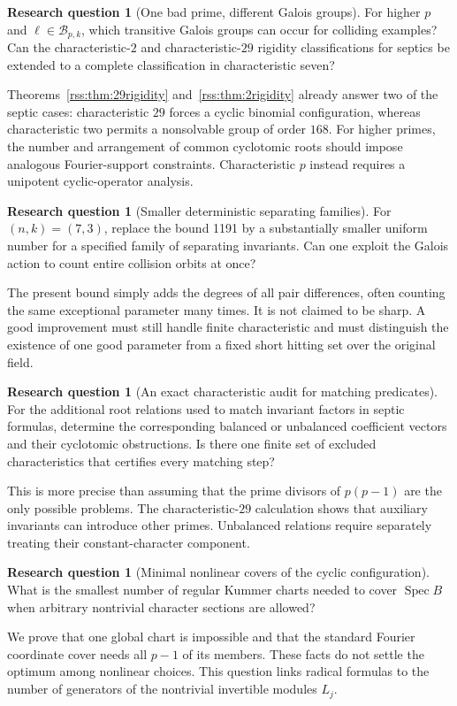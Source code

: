 \documentclass[11pt,a4paper]{article}
\theoremstyle{definition}
\newtheorem{question}[theorem]{Research question}
\theoremstyle{remark}
\newcommand{\Spec}{\operatorname{Spec}}
\begin{document}
\begin{question}[One bad prime, different Galois groups]
For higher $p$ and $\ell\in\mathcal B_{p,k}$, which transitive
Galois groups can occur for colliding examples? Can the characteristic-$2$
and characteristic-$29$ rigidity classifications for septics be extended
to a complete classification in characteristic seven?
\end{question}
Theorems~\ref{rss:thm:29rigidity} and~\ref{rss:thm:2rigidity} already answer two
of the septic cases: characteristic $29$ forces a cyclic binomial
configuration, whereas characteristic two permits a nonsolvable group of
order $168$. For higher primes, the number and arrangement of common
cyclotomic roots should impose analogous Fourier-support constraints.
Characteristic $p$ instead requires a unipotent cyclic-operator analysis.

\begin{question}[Smaller deterministic separating families]
For $(n,k)=(7,3)$, replace the bound 1191 by a substantially smaller uniform
number for a specified family of separating invariants. Can one exploit
the Galois action to count entire collision orbits at once?
\end{question}
The present bound simply adds the degrees of all pair differences, often
counting the same exceptional parameter many times. It is not claimed to
be sharp. A good improvement must still handle finite characteristic and
must distinguish the existence of one good parameter from a fixed short
hitting set over the original field.

\begin{question}[An exact characteristic audit for matching predicates]
For the additional root relations used to match invariant factors in
septic formulas, determine the corresponding balanced or unbalanced
coefficient vectors and their cyclotomic obstructions. Is there one finite
set of excluded characteristics that certifies every matching step?
\end{question}
This is more precise than assuming that the prime divisors of $p(p-1)$
are the only possible problems. The characteristic-$29$ calculation shows
that auxiliary invariants can introduce other primes. Unbalanced
relations require separately treating their constant-character component.

\begin{question}[Minimal nonlinear covers of the cyclic configuration]
\label{ka:q:rss-minimal-covers}
What is the smallest number of regular Kummer charts needed to cover
$\Spec B$ when arbitrary nontrivial character sections are allowed?
\end{question}
We prove that one global chart is impossible and that the standard Fourier
coordinate cover needs all $p-1$ of its members. These facts do not settle
the optimum among nonlinear choices. This question links radical formulas
to the number of generators of the nontrivial invertible modules $L_j$.
\end{document}
